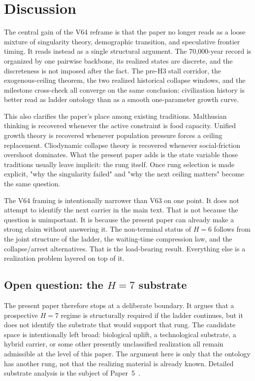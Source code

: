 \documentclass[11pt]{article}
\begin{document}
\section{Discussion}

The central gain of the V64 reframe is that the paper no longer reads as a loose mixture of singularity theory,
demographic transition,
and speculative frontier timing.
It reads instead as a single structural argument.
The 70,000-year record is organized by one pairwise backbone,
its realized states are discrete,
and the discreteness is not imposed after the fact.
The pre-H3 stall corridor,
the exogenous-ceiling theorem,
the two realized historical collapse windows,
and the milestone cross-check all converge on the same conclusion:
civilization history is better read as ladder ontology than as a smooth one-parameter growth curve.

This also clarifies the paper's place among existing traditions.
Malthusian thinking is recovered whenever the active constraint is food capacity.
Unified growth theory is recovered whenever population pressure forces a ceiling replacement.
Cliodynamic collapse theory is recovered whenever social-friction overshoot dominates.
What the present paper adds is the state variable those traditions usually leave implicit:
the rung itself.
Once rung selection is made explicit,
"why the singularity failed" and
"why the next ceiling matters"
become the same question.

The V64 framing is intentionally narrower than V63 on one point.
It does not attempt to identify the next carrier in the main text.
That is not because the question is unimportant.
It is because the present paper can already make a strong claim without answering it.
The non-terminal status of
\(H{=}6\)
follows from the joint structure of the ladder,
the waiting-time compression law,
and the collapse/arrest alternatives.
That is the load-bearing result.
Everything else is a realization problem layered on top of it.

\subsection*{Open question: the \(H{=}7\) substrate}\label{sec:open-h7-substrate}

The present paper therefore stops at a deliberate boundary.
It argues that a prospective
\(H{=}7\)
regime is structurally required if the ladder continues,
but it does not identify the substrate that would support that rung.
The candidate space is intentionally left broad:
biological uplift,
a technological substrate,
a hybrid carrier,
or some other presently unclassified realization all remain admissible at the level of this paper.
The argument here is only that the ontology has another rung,
not that the realizing material is already known.
Detailed substrate analysis is the subject of Paper~5~\cite{Kato2026e}.
\end{document}
